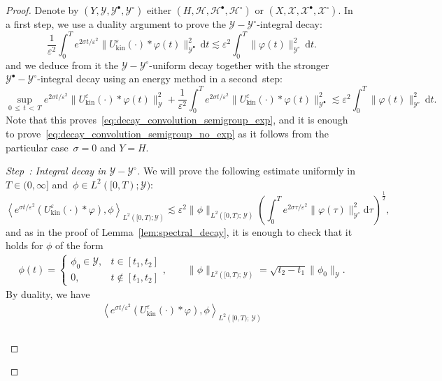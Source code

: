\documentclass[10pt]{amsart}
\theoremstyle{definition}\newtheorem{defi}[theo]{Definition}\newtheorem{rema}[theo]{Remark}\newtheorem{exam}[theo]{Example}\newtheorem{exem}[theo]{Example}\newtheorem{nota}[theo]{Notation}
\newcommand{\kin}{\mathrm{kin}}
\renewcommand{\d}{\mathrm{d}}
\newcommand{\XX}{\mathcal{X}}
\newcommand{\HH}{\mathcal{H}}
\newcommand{\VV}{\mathcal{Y}}
\newcommand{\Ss}{H}
\newcommand{\SSs}{\HH}
\newcommand{\SSsp}{\HH^{\bullet}}
\newcommand{\SSsm}{\HH^{\circ}}
\newcommand{\Sl}{X}
\newcommand{\SSl}{\XX}
\newcommand{\SSlp}{\XX^{\bullet}}
\newcommand{\SSlm}{\XX^{\circ}}
\newcommand{\Sg}{Y}
\newcommand{\SSg}{\VV}
\newcommand{\SSgp}{\VV^{\bullet}}
\newcommand{\SSgm}{\VV^{\circ}}
\renewcommand*\le{\leqslant}
\newcommand*\eps{{\varepsilon}}
\newcommand{\la}{\langle}
\newcommand{\ra}{\rangle}
\newcounter{stepcount}
\newenvironment{step}[1]{\refstepcounter{stepcount}\begin{proof}[Step~\thestepcount: #1]}{\let\qed\relax\end{proof}}
\begin{document}
\begin{proof}
Denote by $(\Sg, \SSg, \SSgp, \SSgm)$ either $(\Ss, \SSs, \SSsp, \SSsm)$ or $(\Sl, \SSl, \SSlp, \SSlm)$. In a first step, we use a duality argument to prove the $\SSg-\SSgm$-integral decay:
\begin{equation*}
\frac{1}{\eps^2} \int_0^T e^{2 \sigma t / \eps^2} \| U^\eps_\kin(\cdot) * \varphi (t) \|_{\SSgp}^2 \, \d t \lesssim \eps^2 \int_0^T \| \varphi(t) \|_{ \SSgm }^2 \, \d t.
\end{equation*}
and we deduce from it the $\SSg-\SSgm$-uniform decay together with the stronger $\SSgp-\SSgm$-integral decay using an energy method in a second~step:
\begin{equation*}
\sup_{0\,\le\,t\,<\,T} e^{2 \sigma t / \eps^2} \| U^\eps_\kin(\cdot) * \varphi (t) \|_{\SSg}^2 + \frac{1}{\eps^2} \int_0^T e^{2 \sigma t / \eps^2} \| U^\eps_\kin(\cdot) * \varphi (t) \|_{\SSgp}^2 \lesssim \eps^2 \int_0^T \| \varphi(t) \|_{ \SSgm }^2 \, \d t.
\end{equation*}
Note that this proves~\eqref{eq:decay_convolution_semigroup_exp}, and it is enough to prove~\eqref{eq:decay_convolution_semigroup_no_exp} as it follows from the particular case~$\sigma = 0$ and $\Sg = \Ss$.
\setcounter{stepcount}{0}
\begin{step}{{Integral decay in $\SSg-\SSgm$}}\label{prflemm4.9step1}
We will prove the following estimate uniformly in $T \in (0, \infty]$ and~$\phi \in L^2([0, T) ; \SSg)$:
\[
\left\la e^{\sigma t / \eps^2 } \left(U^\eps_\kin(\cdot) * \varphi\right), \phi \right\ra_{L^2\left([0, T) ; \SSg\right) } \lesssim \eps^2 \| \phi \|_{L^2\left([0, T) ; \,\SSg\right) } \left(\int_0^T e^{2\sigma \tau / \eps^2 } \| \varphi(\tau) \|_{\SSgm}^2 \d \tau\right)^{\frac{1}{2}},
\]
and as in the proof of Lemma~\ref{lem:spectral_decay}, it is enough to check that it holds for $\phi$ of the form
\begin{gather*}
\phi(t) =
\begin{cases}
\phi_0 \in \SSg, & t \in [t_1, t_2]\\
0, & t \notin [t_1, t_2]
\end{cases}, \qquad \| \phi \|_{ L^2\left([0, T) ;\,\SSg \right) } = \sqrt{t_2 - t_1} \| \phi_0 \|_{\SSg}.
\end{gather*}
By duality, we have
\begin{multline*}
\left\la e^{\sigma t / \eps^2} (U^\eps_\kin(\cdot) * \varphi), \phi \right\ra_{ L^2\left([0, T) ;\,\SSg \right) } \\
\begin{aligned}

\end{aligned}
\end{multline*}
\end{step}
\end{proof}
\end{document}
